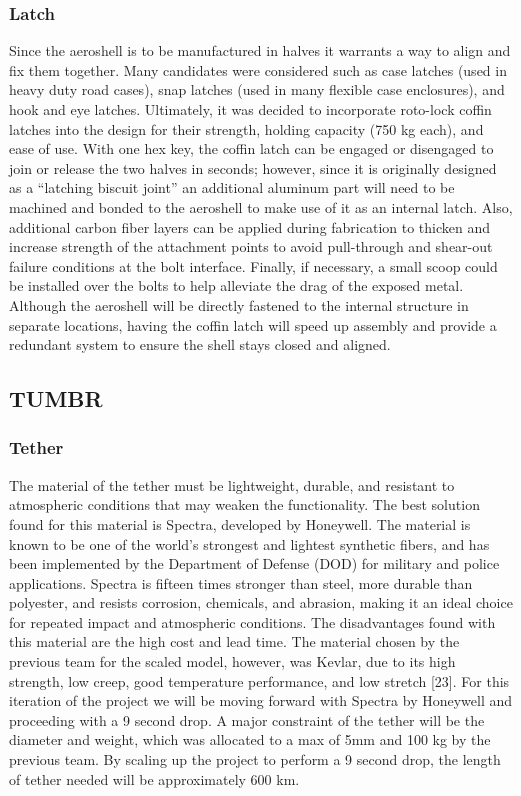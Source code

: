 \subsubsection{Latch}

\indent\indent Since the aeroshell is to be manufactured in halves it warrants a way to align and fix them together. Many candidates were considered such as case latches (used in heavy duty road cases), snap latches (used in many flexible case enclosures), and hook and eye latches. Ultimately, it was decided to incorporate roto-lock coffin latches into the design for their strength, holding capacity (750 kg each), and ease of use. With one hex key, the coffin latch can be engaged or disengaged to join or release the two halves in seconds; however, since it is originally designed as a “latching biscuit joint” an additional aluminum part will need to be machined and bonded to the aeroshell to make use of it as an internal latch. Also, additional carbon fiber layers can be applied during fabrication to thicken and increase strength of the attachment points to avoid pull-through and shear-out failure conditions at the bolt interface. Finally, if necessary, a small scoop could be installed over the bolts to help alleviate the drag of the exposed metal. Although the aeroshell will be directly fastened to the internal structure in separate locations, having the coffin latch will speed up assembly and provide a redundant system to ensure the shell stays closed and aligned.

\subsection{TUMBR}

\subsubsection{Tether}

\indent\indent The material of the tether must be lightweight, durable, and resistant to atmospheric conditions that may weaken the functionality. The best solution found for this material is Spectra, developed by Honeywell. The material is known to be one of the world’s strongest and lightest synthetic fibers, and has been implemented by the Department of Defense (DOD) for military and police applications. Spectra is fifteen times stronger than steel, more durable than polyester, and resists corrosion, chemicals, and abrasion, making it an ideal choice for repeated impact and atmospheric conditions. The disadvantages found with this material are the high cost and lead time. The material chosen by the previous team for the scaled model, however, was Kevlar, due to its high strength, low creep, good temperature performance, and low stretch [23]. For this iteration of the project we will be moving forward with Spectra by Honeywell and proceeding with a 9 second drop. A major constraint of the tether will be the diameter and weight, which was allocated to a max of 5mm and 100 kg by the previous team. By scaling up the project to perform a 9 second drop, the length of tether needed will be approximately 600 km.

